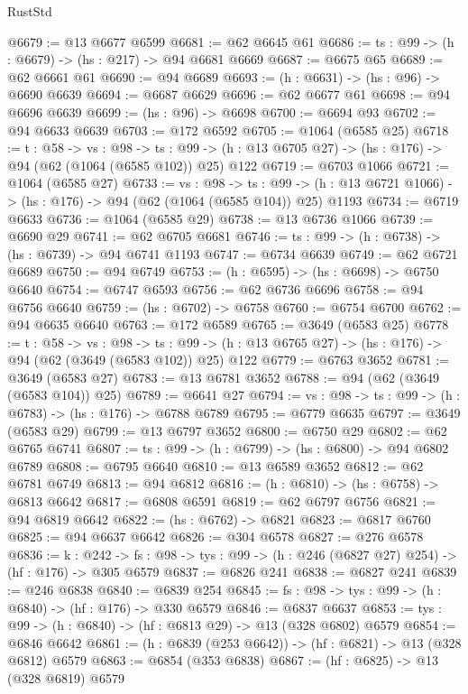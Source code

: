 \begin{lexlean}{RustStd}
\begin{coremodule}
{\begin{coremodule}
{{{{{{{{{{{@6679 := @13 @6677 @6599
@6681 := @62 @6645 @61
@6686 := {ts : @99} -> (h : @6679) -> (hs : @217) -> @94 @6681 @6669
@6687 := @6675 @65
@6689 := @62 @6661 @61
@6690 := @94 @6689
@6693 := (h : @6631) -> (hs : @96) -> @6690 @6639
@6694 := @6687 @6629
@6696 := @62 @6677 @61
@6698 := @94 @6696 @6639
@6699 := (hs : @96) -> @6698
@6700 := @6694 @93
@6702 := @94 @6633 @6639
@6703 := @172 @6592
@6705 := @1064 (@6585 @25)
@6718 := {t : @58} ->
  {vs : @98} ->
  {ts : @99} -> (h : @13 @6705 @27) -> (hs : @176) -> @94 (@62 (@1064 (@6585 @102)) @25) @122
@6719 := @6703 @1066
@6721 := @1064 (@6585 @27)
@6733 := {vs : @98} ->
  {ts : @99} -> (h : @13 @6721 @1066) -> (hs : @176) -> @94 (@62 (@1064 (@6585 @104)) @25) @1193
@6734 := @6719 @6633
@6736 := @1064 (@6585 @29)
@6738 := @13 @6736 @1066
@6739 := @6690 @29
@6741 := @62 @6705 @6681
@6746 := {ts : @99} -> (h : @6738) -> (hs : @6739) -> @94 @6741 @1193
@6747 := @6734 @6639
@6749 := @62 @6721 @6689
@6750 := @94 @6749
@6753 := (h : @6595) -> (hs : @6698) -> @6750 @6640
@6754 := @6747 @6593
@6756 := @62 @6736 @6696
@6758 := @94 @6756 @6640
@6759 := (hs : @6702) -> @6758
@6760 := @6754 @6700
@6762 := @94 @6635 @6640
@6763 := @172 @6589
@6765 := @3649 (@6583 @25)
@6778 := {t : @58} ->
  {vs : @98} ->
  {ts : @99} -> (h : @13 @6765 @27) -> (hs : @176) -> @94 (@62 (@3649 (@6583 @102)) @25) @122
@6779 := @6763 @3652
@6781 := @3649 (@6583 @27)
@6783 := @13 @6781 @3652
@6788 := @94 (@62 (@3649 (@6583 @104)) @25)
@6789 := @6641 @27
@6794 := {vs : @98} -> {ts : @99} -> (h : @6783) -> (hs : @176) -> @6788 @6789
@6795 := @6779 @6635
@6797 := @3649 (@6583 @29)
@6799 := @13 @6797 @3652
@6800 := @6750 @29
@6802 := @62 @6765 @6741
@6807 := {ts : @99} -> (h : @6799) -> (hs : @6800) -> @94 @6802 @6789
@6808 := @6795 @6640
@6810 := @13 @6589 @3652
@6812 := @62 @6781 @6749
@6813 := @94 @6812
@6816 := (h : @6810) -> (hs : @6758) -> @6813 @6642
@6817 := @6808 @6591
@6819 := @62 @6797 @6756
@6821 := @94 @6819 @6642
@6822 := (hs : @6762) -> @6821
@6823 := @6817 @6760
@6825 := @94 @6637 @6642
@6826 := @304 @6578
@6827 := @276 @6578
@6836 := {k : @242} ->
  {fs : @98} -> {tys : @99} -> (h : @246 (@6827 @27) @254) -> (hf : @176) -> @305 @6579
@6837 := @6826 @241
@6838 := @6827 @241
@6839 := @246 @6838
@6840 := @6839 @254
@6845 := {fs : @98} -> {tys : @99} -> (h : @6840) -> (hf : @176) -> @330 @6579
@6846 := @6837 @6637
@6853 := {tys : @99} -> (h : @6840) -> (hf : @6813 @29) -> @13 (@328 @6802) @6579
@6854 := @6846 @6642
@6861 := (h : @6839 (@253 @6642)) -> (hf : @6821) -> @13 (@328 @6812) @6579
@6863 := @6854 (@353 @6838)
@6867 := (hf : @6825) -> @13 (@328 @6819) @6579
}}}}}}}}}}}
\end{coremodule}}
\end{coremodule}
\end{lexlean}
